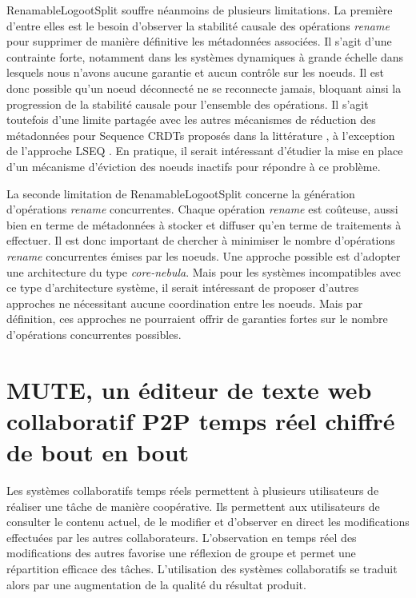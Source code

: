 \documentclass[12pt]{thesul}
\begin{document}
RenamableLogootSplit souffre néanmoins de plusieurs limitations.
La première d'entre elles est le besoin d'observer la stabilité causale des opérations \emph{rename} pour supprimer de manière définitive les métadonnées associées.
Il s'agit d'une contrainte forte, notamment dans les systèmes dynamiques à grande échelle dans lesquels nous n'avons aucune garantie et aucun contrôle sur les noeuds.
Il est donc possible qu'un noeud déconnecté ne se reconnecte jamais, bloquant ainsi la progression de la stabilité causale pour l'ensemble des opérations.
Il s'agit toutefois d'une limite partagée avec les autres mécanismes de réduction des métadonnées pour Sequence \acp{CRDT} proposés dans la littérature \cite{ROH2011354, zawirski:hal-01248197}, à l'exception de l'approche LSEQ \cite{lseq2017}.
En pratique, il serait intéressant d'étudier la mise en place d'un mécanisme d'éviction des noeuds inactifs pour répondre à ce problème.

La seconde limitation de RenamableLogootSplit concerne la génération d'opérations \emph{rename} concurrentes.
Chaque opération \emph{rename} est coûteuse, aussi bien en terme de métadonnées à stocker et diffuser qu'en terme de traitements à effectuer.
Il est donc important de chercher à minimiser le nombre d'opérations \emph{rename} concurrentes émises par les noeuds.
Une approche possible est d'adopter une architecture du type \emph{core-nebula}\cite{zawirski:hal-01248197}.
Mais pour les systèmes incompatibles avec ce type d'architecture système, il serait intéressant de proposer d'autres approches ne nécessitant aucune coordination entre les noeuds.
Mais par définition, ces approches ne pourraient offrir de garanties fortes sur le nombre d'opérations concurrentes possibles.

% 

\NumberThisInToc
\chapter{MUTE, un éditeur de texte web collaboratif P2P temps réel chiffré de bout en bout}
\minitoc

Les systèmes collaboratifs temps réels permettent à plusieurs utilisateurs de réaliser une tâche de manière coopérative.
Ils permettent aux utilisateurs de consulter le contenu actuel, de le modifier et d'observer en direct les modifications effectuées par les autres collaborateurs.
L'observation en temps réel des modifications des autres favorise une réflexion de groupe et permet une répartition efficace des tâches.
L'utilisation des systèmes collaboratifs se traduit alors par une augmentation de la qualité du résultat produit\cite{2004-empirical-study-collaborative-writing, 2005-internet-encyclopaedias-head-to-head}.
\end{document}
